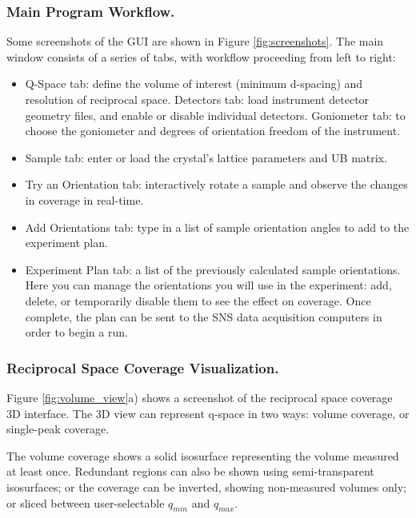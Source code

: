 \documentclass{iucr}              %
\begin{document}
\subsubsection{Main Program Workflow.}
Some screenshots of the GUI are shown in Figure \ref{fig:screenshots}. The main
window consists of a series of tabs, with workflow proceeding from left to right:  

\begin{itemize}
  \item Q-Space tab: define the volume of interest (minimum d-spacing) and
resolution of reciprocal space. Detectors tab: load instrument detector geometry
files, and enable or disable individual detectors. Goniometer tab: to choose the
goniometer and degrees of orientation freedom of the instrument.
   
  \item Sample tab: enter or load the crystal's lattice parameters and UB matrix.

  \item Try an Orientation tab: interactively rotate a sample and observe the
  changes in coverage in real-time.
   
  \item Add Orientations tab: type in a list of sample orientation angles to add
  to the experiment plan.
 
  \item Experiment Plan tab: a list of the previously calculated sample orientations.
Here you can manage the orientations you will use in the experiment: add,
delete, or temporarily disable them to see the effect on coverage. Once
complete, the plan can be sent to the SNS data acquisition computers in order to
begin a run.
    
\end{itemize} 



\subsubsection{Reciprocal Space Coverage Visualization.}
Figure \ref{fig:volume_view}a) shows a screenshot of the reciprocal space
coverage 3D interface. The 3D view can represent q-space in two ways: volume coverage, or single-peak
coverage.  

The volume coverage shows a solid isosurface representing the volume measured at
least once. Redundant regions can also be shown using semi-transparent
isosurfaces; or the coverage can be inverted, showing non-measured volumes only;
or sliced between user-selectable $q_{min}$ and $q_{max}$.        
\end{document}
